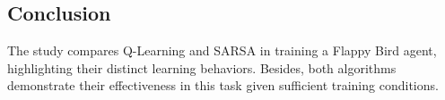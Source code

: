 \documentclass[conference]{IEEEtran}
\begin{document}
\subsection{Conclusion}
The study compares Q-Learning and SARSA in training a Flappy Bird agent, highlighting their distinct learning behaviors. Besides, both algorithms demonstrate their effectiveness in this task given sufficient training conditions.

%    
\end{document}
